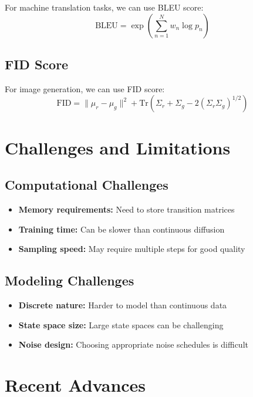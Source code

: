 For machine translation tasks, we can use BLEU score:
\begin{equation}
    \text{BLEU} = \exp\left(\sum_{n=1}^N w_n \log p_n\right)
\end{equation}

\subsection{FID Score}

For image generation, we can use FID score:
\begin{equation}
    \text{FID} = \|\mu_r - \mu_g\|^2 + \text{Tr}(\Sigma_r + \Sigma_g - 2(\Sigma_r \Sigma_g)^{1/2})
\end{equation}

\section{Challenges and Limitations}

\subsection{Computational Challenges}

\begin{itemize}
    \item \textbf{Memory requirements:} Need to store transition matrices
    \item \textbf{Training time:} Can be slower than continuous diffusion
    \item \textbf{Sampling speed:} May require multiple steps for good quality
\end{itemize}

\subsection{Modeling Challenges}

\begin{itemize}
    \item \textbf{Discrete nature:} Harder to model than continuous data
    \item \textbf{State space size:} Large state spaces can be challenging
    \item \textbf{Noise design:} Choosing appropriate noise schedules is difficult
\end{itemize}

\section{Recent Advances}

